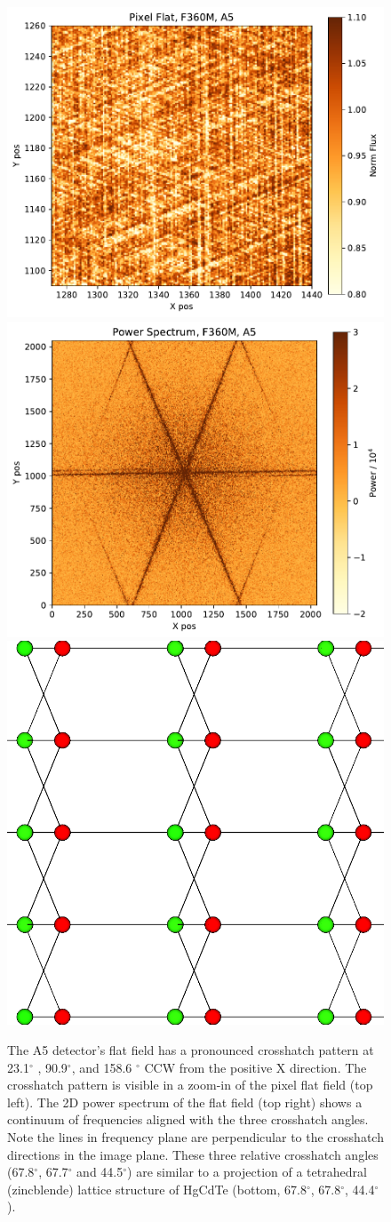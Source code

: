 \documentclass{aastex62}
\newcommand{\degree}{^\circ}
\begin{document}
\begin{figure}[!hbtp]
\centering
\includegraphics[width=.49\columnwidth]{crosshatch_zoom.pdf}
\includegraphics[width=.49\columnwidth]{crosshatch_2d_power.pdf}
\includegraphics[width=.3\columnwidth]{tetrahedral_lattice_projection.png}
\caption{
The A5 detector's flat field has a pronounced crosshatch pattern at 23.1$\degree$ , 90.9$\degree$, and 158.6 $\degree$ CCW from the positive X direction.
The crosshatch pattern is visible in a zoom-in of the pixel flat field (top left).
The 2D power spectrum of the flat field (top right) shows a continuum of frequencies aligned with the three crosshatch angles.
Note the lines in frequency plane are perpendicular to the crosshatch directions in the image plane.
These three relative crosshatch angles (67.8$\degree$, 67.7$\degree$ and 44.5$\degree$) are similar to a projection of a tetrahedral (zincblende) lattice structure of HgCdTe (bottom, 67.8$\degree$, 67.8$\degree$, 44.4$\degree$).
}\label{fig:crossHatchA5}
\end{figure}
\end{document}
